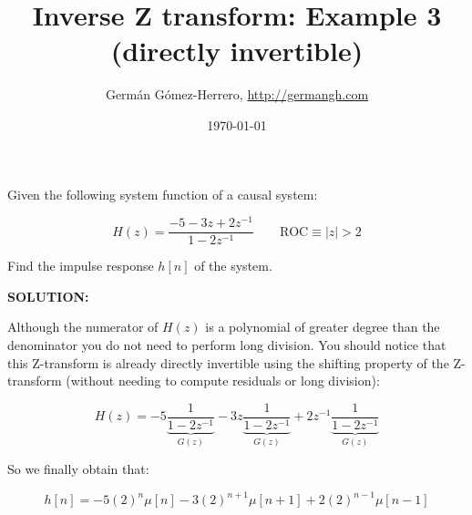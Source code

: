 \documentclass[a4paper,11pt,oneside]{article}
\title{Inverse Z transform: Example 3 (directly invertible)}
\date{\today}
\author{Germ\'an G\'omez-Herrero, \url{http://germangh.com}}
\begin{document}
\maketitle

Given the following system function of a causal system:

\begin{equation}\label{eq:Yz}
H(z)=\frac{-5-3z+2z^{-1}}{1-2z^{-1}} \qquad \textrm{ROC}\equiv |z|>2 
\end{equation}

Find the impulse response $h[n]$ of the system.


\vspace{1cm}

\textbf{SOLUTION:}

Although the numerator of $H(z)$ is a polynomial of greater degree than the denominator you do not need to perform long division. You should notice that this Z-transform is already directly invertible using the shifting property of the Z-transform (without needing to compute residuals or long division):

\[
H(z)=-5\underbrace{\frac{1}{1-2z^{-1}}}_{G(z)}-3z\underbrace{\frac{1}{1-2z^{-1}}}_{G(z)}+2z^{-1}\underbrace{\frac{1}{1-2z^{-1}}}_{G(z)}
\]

So we finally obtain that:

\begin{equation}\label{eq:yn}
h[n] = -5(2)^n\mu[n]-3(2)^{n+1}\mu[n+1]+2(2)^{n-1}\mu[n-1]
\end{equation}
\end{document}
